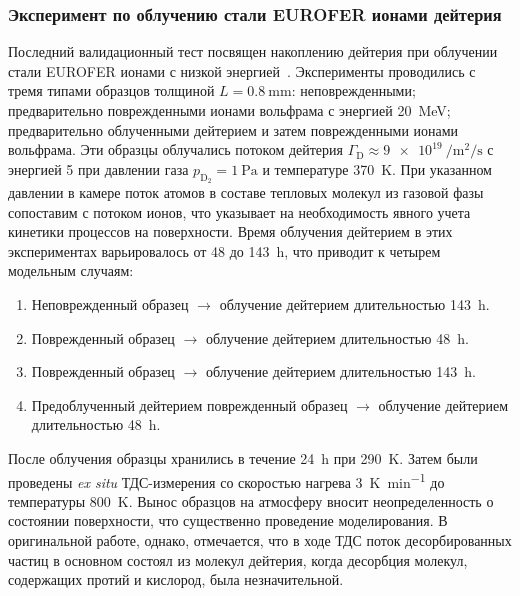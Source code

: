 \subsubsection{Эксперимент по облучению стали EUROFER ионами дейтерия}
Последний валидационный тест посвящен накоплению дейтерия при облучении стали EUROFER ионами с низкой энергией~\cite{Schmid2023_1}. Эксперименты проводились с тремя типами образцов толщиной \(L=\SI{0.8}{\milli\meter}\): неповрежденными; предварительно поврежденными ионами вольфрама с энергией \SI{20}{\mega\electronvolt}; предварительно облученными дейтерием и затем поврежденными ионами вольфрама. Эти образцы облучались потоком дейтерия $\Gamma_\mathrm{D}\approx\SI{9e19}{\per\meter\squared\per\second}$ с энергией \SI{5}{} при давлении газа $p_\mathrm{D_2}=\SI{1}{\pascal}$ и температуре \SI{370}{K}. При указанном давлении в камере поток атомов в составе тепловых молекул из газовой фазы сопоставим с потоком ионов, что указывает на необходимость явного учета кинетики процессов на поверхности. Время облучения дейтерием в этих экспериментах варьировалось от \num{48} до \SI{143}{\hour}, что приводит к четырем модельным случаям:
\begin{enumerate}[beginpenalty=10000]
    \item Неповрежденный образец $\rightarrow$ облучение дейтерием длительностью \SI{143}{\hour}.
    \item Поврежденный образец $\rightarrow$ облучение дейтерием длительностью \SI{48}{\hour}.
    \item Поврежденный образец $\rightarrow$ облучение дейтерием длительностью \SI{143}{\hour}.
    \item Предоблученный дейтерием поврежденный образец $\rightarrow$ облучение дейтерием длительностью \SI{48}{\hour}.
\end{enumerate}
После облучения образцы хранились в течение \SI{24}{\hour} при \SI{290}{\kelvin}. Затем были проведены \textit{ex situ} ТДС-измерения со скоростью нагрева \SI{3}{\kelvin\per\minute} до температуры \SI{800}{\kelvin}. Вынос образцов на атмосферу вносит неопределенность о состоянии поверхности, что существенно проведение моделирования. В оригинальной работе, однако, отмечается, что в ходе ТДС поток десорбированных частиц в основном состоял из молекул дейтерия, когда десорбция молекул, содержащих протий и кислород, была незначительной.

